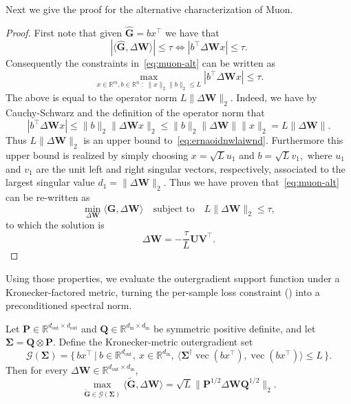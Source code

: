 \documentclass[11pt]{article}
\renewcommand{\vec}{\operatorname{vec}}
\newcommand{\mat}[1]{\bm{#1}}
\newcommand{\R}{\mathbb{R}}
\newcommand{\ip}[1]{\langle #1 \rangle}
\newcommand{\norm}[1]{\| #1\|}
\begin{document}
Next we give the proof for the alternative characterization of Muon.
\muonview*
\begin{proof}
  First note that given $\hat{\mat{G}} = b x^\top$ we have that
  \[ |\ip{\hat{\mat{G}},\Delta\mat{W}}| \leq \tau \Leftrightarrow |b^\top \Delta\mat{W} x| \le \tau.\]
Consequently
  the constraints in~\eqref{eq:muon-alt} can be written as
  \begin{equation} \label{eq:ernaoidnwlaiwnd}
       \max_{x \in \R^{m}, b \in \R^n\;:\;   \|x\|_2\|b\|_2 \leq L}   |b^\top \Delta\mat{W} x| \le \tau. \end{equation}
  The above is equal to the operator norm  $L\|\Delta\mat{W}\|_2$. Indeed, we have by  Cauchy-Schwarz and the definition of the operator norm that
  \[ |b^\top \Delta\mat{W} x| \leq  \|b\|_2 \|\Delta\mat{W} x\|_2 \leq  \|b\|_2 \|\Delta\mat{W} \| \| x\|_2  = L \|\Delta\mat{W} \|. \]
  Thus $L\|\Delta\mat{W}\|_2$ is an upper bound to~\eqref{eq:ernaoidnwlaiwnd}. Furthermore this upper bound is realized by simply choosing $x = \sqrt{L} u_1$ and $b = \sqrt{L} v_1,$ where $u_1$ and $v_1$ are the unit left and right singular vectors, respectively, associated to the largest singular value $d_1 = \|\Delta\mat{W}\|_2.$  Thus we have proven that~\eqref{eq:muon-alt} can be re-written as 
  \begin{equation}\label{eq:muon-alt-}
    \min_{\Delta\mat{W}} \ip{\mat{G}, \Delta\mat{W}} \quad \mbox{subject to} \quad
L \|\Delta\mat{W}\|_2 \leq \tau,
\end{equation}
to which the solution is
\begin{equation}
  \Delta\mat{W} = - \frac{\tau}{L} \mat{U} \mat{V}^\top.
\end{equation}

\end{proof}





Using those properties, we evaluate the outergradient support function under a Kronecker-factored metric, turning the per-sample loss constraint () into a preconditioned spectral norm.
\begin{lemma}
\label{lem:pseudogradient-spectral}
Let
$\mat{P}\in\R^{d_{\mathrm{out}}\times d_{\mathrm{out}}}$ and
$\mat{Q}\in\R^{d_{\mathrm{in}}\times d_{\mathrm{in}}}$ be symmetric positive definite,
and let $\mat{\Sigma}=\mat{Q}\otimes \mat{P}$. Define the Kronecker-metric outergradient set
\[
\mathcal{G}(\mat{\Sigma})=\bigl\{\, bx^\top ~\big|~ b\in\R^{d_{\mathrm{out}}},\ x\in\R^{d_{\mathrm{in}}},\ \ip{\mat{\Sigma}^\dagger\vec(bx^\top),\vec(bx^\top)}\leq L\,\bigr\}.
\]
Then for every $\Delta\mat{W}\in\R^{d_{\mathrm{out}}\times d_{\mathrm{in}}}$,
\[
  \max_{\widetilde{\mat{G}} \in \mathcal{G}(\mat{\Sigma})} \ip{ \widetilde{\mat{G}} , \Delta\mat{W}}
  =\sqrt{L}\norm{\mat{P}^{1/2}\Delta\mat{W} \mat{Q}^{1/2}}_2 .
\]
\end{lemma}
\end{document}
